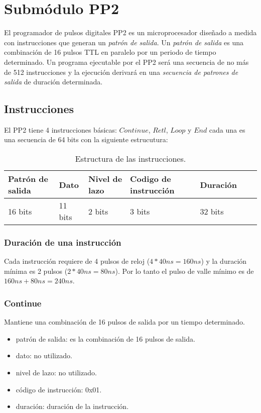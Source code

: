 \section{Subm\'odulo PP2}

El programador de pulsos digitales PP2 es un microprocesador dise\~nado a medida con instrucciones que generan
un \textit{patr\'on de salida}.
Un \textit{patr\'on de salida} es una combinaci\'on de 16 pulsos TTL en paralelo por un periodo 
de tiempo determinado.
Un programa ejecutable por el PP2 ser\'a una secuencia de no m\'as de 512 instrucciones 
y la ejecuci\'on derivar\'a en una \textit{secuencia de patrones de salida} de duraci\'on determinada.


\subsection{Instrucciones}

El PP2 tiene 4 instrucciones b\'asicas: $Continue$, $Retl$, $Loop$ y $End$ 
cada una es una secuencia de 64 bits con la siguiente estrucutura:\\
\begin{table}[ht]
    \centering
    \begin{tabular}{|l|l|l|l|l|l|l|}
    \hline
    Patr\'on de salida  & Dato & Nivel de lazo & Codigo de instrucci\'on & Duraci\'on \\
    \hline
    16 bits & 11 bits & 2 bits & 3 bits & 32 bits\\
    \hline
\end{tabular}
\caption{\label{tab:pp2_ins}Estructura de las instrucciones.}
\end{table}


\subsubsection{Duraci\'on de una instrucci\'on}
Cada instrucci\'on requiere de 4 pulsos de reloj ($4 * 40ns = 160ns$) 
y la duraci\'on m\'inima es 2 pulsos ($2 * 40ns = 80ns$). Por lo tanto el pulso de
valle m\'inimo es de $160ns + 80ns = 240ns$.

\subsubsection{Continue}
Mantiene una combinaci\'on de 16 pulsos de salida por un tiempo determinado.
\begin{itemize}
    \item patr\'on de salida: es la combinaci\'on de 16 pulsos de salida.
    \item dato: no utilizado.
    \item nivel de lazo: no utilizado.
    \item c\'odigo de instrucci\'on: 0x01.
    \item duraci\'on: duraci\'on de la instrucci\'on.
\end{itemize}

